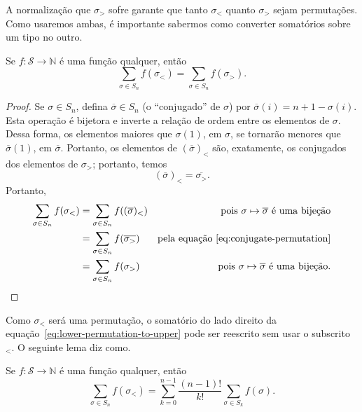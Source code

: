 A normalização que $\sigma_>$ sofre garante que
tanto $\sigma_<$ quanto $\sigma_>$ sejam permutações.
Como usaremos ambas,
é importante sabermos como converter somatórios sobre um tipo no outro.

\begin{lemma}
    Se $f: \mathcal S \to \mathbb N$ é uma função qualquer,
    então
    \begin{equation}
        \sum_{\sigma \in S_n} f(\sigma_<) = \sum_{\sigma \in S_n} f(\sigma_>).
        \label{eq:lower-permutation-to-upper}
    \end{equation}
\end{lemma}

\begin{proof}
    Se $\sigma \in S_n$,
    defina $\overline \sigma \in S_n$
    (o ``conjugado'' de $\sigma$)
    por $\overline \sigma(i) = n + 1 - \sigma(i)$.
    Esta operação é bijetora
    e inverte a relação de ordem entre os elementos de $\sigma$.
    Dessa forma, os elementos maiores que $\sigma(1)$, em $\sigma$,
    se tornarão menores que $\overline \sigma(1)$, em $\overline \sigma$.
    Portanto,
    os elementos de $(\overline \sigma)_<$ são,
    exatamente,
    os conjugados dos elementos de $\sigma_>$;
    portanto, temos
    \begin{equation}
        (\overline \sigma)_< = \overline{\sigma_>}.
        \label{eq:conjugate-permutation}
    \end{equation}
    Portanto,
    \begin{align*}
        \sum_{\sigma \in S_n} f(\sigma_<) &= \sum_{\sigma \in S_n} f((\overline \sigma)_<)
        &\text{pois $\sigma \mapsto \overline \sigma$ é uma bijeção} \\
        &= \sum_{\sigma \in S_n} f(\overline{\sigma_>})
        &\text{pela equação~\ref{eq:conjugate-permutation}} \\
        &= \sum_{\sigma \in S_n} f(\sigma_>)
        &\text{pois $\sigma \mapsto \overline \sigma$ é uma bijeção.}
    \end{align*}
\end{proof}

Como $\sigma_<$ será uma permutação,
o somatório do lado direito da equação~\ref{eq:lower-permutation-to-upper}
pode ser reescrito sem usar o subscrito ${}_<$.
O seguinte lema diz como.

\begin{lemma}
    Se $f: \mathcal S \to \mathbb N$ é uma função qualquer,
    então
    \begin{equation}
        \sum_{\sigma \in S_n} f(\sigma_<)
            = \sum_{k = 0}^{n-1} \frac{(n-1)!}{k!} \sum_{\sigma \in S_k} f(\sigma).
        \label{eq:sum-partitions}
    \end{equation}
\end{lemma}

